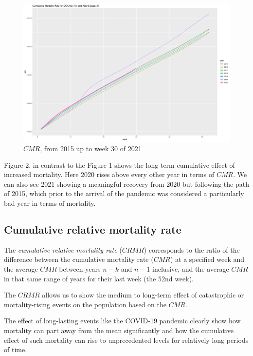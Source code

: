 \documentclass[
  a4paper]{article}
\begin{document}
\begin{figure}
\centering
\includegraphics{./images/cmr.png}
\caption{\(CMR\), from 2015 up to week 30 of 2021}
\end{figure}

Figure 2, in contrast to the Figure 1 shows the long term cumulative
effect of increased mortality. Here 2020 rises above every other year in
terms of \(CMR\). We can also see 2021 showing a meaningful recovery
from 2020 but following the path of 2015, which prior to the arrival of
the pandemic was considered a particularly bad year in terms of
mortality.

\hypertarget{CRMR}{%
\subsection{Cumulative relative mortality rate}\label{CRMR}}

The \emph{cumulative relative mortality rate} (\(CRMR\)) corresponds to
the ratio of the difference between the cumulative mortality rate
(\(CMR\)) at a specified week and the average \(CMR\) between years
\(n-k\) and \(n-1\) inclusive, and the average \(CMR\) in that same
range of years for their last week (the 52nd week).

The \(CRMR\) allows us to show the medium to long-term effect of
catastrophic or mortality-rising events on the population based on the
\(CMR\).

The effect of long-lasting events like the COVID-19 pandemic clearly
show how mortality can part away from the mean significantly and how the
cumulative effect of such mortality can rise to unprecedented levels for
relatively long periods of time.
\end{document}
